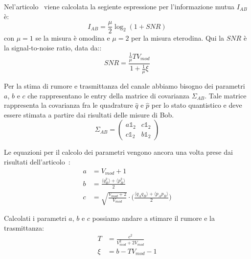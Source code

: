 Nel'articolo~\cite{https://doi.org/10.1002/qute.201800011} viene calcolata la segiente espressione per l'informazione mutua $I_{AB}$ \`e:
\begin{equation} \label{eq:AB-info}
I_{AB} = \frac{\mu}{2}\log_2(1 + SNR)
\end{equation}
con $\mu = 1$ se la misura \`e omodina e $\mu = 2$ per la misura eterodina. Qui la $SNR$ è la signal-to-noise ratio, data da::
\begin{equation} \label{eq:snr}
SNR = \frac{\frac{1}{\mu} T V_{mod}}{1 + \frac{1}{\mu} \xi}
\end{equation}

Per la stima di rumore e trasmittanza del canale abbiamo bisogno dei parametri $a$, $b$ e $c$ che rappresentano le entry della matrice di covarianza $\Sigma_{AB}$. Tale matrice rappresenta la covarianza fra le quadrature $\hat q$ e $\hat p$ per lo stato quantistico e deve essere stimata a partire dai risultati delle misure di Bob.
\begin{equation}
\Sigma_{AB} =
\begin{pmatrix}
a \mathbb{1}_2 & c \mathbb{1}_2 \\
c \mathbb{1}_2 & b \mathbb{1}_2
\end{pmatrix}
\end{equation}

Le equazioni per il calcolo dei parametri vengono ancora una volta prese dai risultati dell'articolo~\cite{https://doi.org/10.1002/qute.201800011}:
\begin{equation}
\begin{split}
a& = V_{mod} + 1 \\
b& = \frac{\langle q_B^2 \rangle + \langle p_B^2 \rangle}{2} \\
c& = \sqrt{\frac{V_{mod} + 2}{V_{mod}}} \cdot \biggl ( \frac{\langle q_Aq_B \rangle + \langle p_Ap_B \rangle}{2}\biggr )
\end{split}
\end{equation}

Calcolati i parametri $a$, $b$ e $c$ possiamo andare a stimare il rumore e la trasmittanza:
\begin{equation}
\begin{split}
T& = \frac{c^2}{V_{mod}^2 + 2V_{mod}} \\
\xi& = b - TV_{mod} -1
\end{split}
\end{equation}

